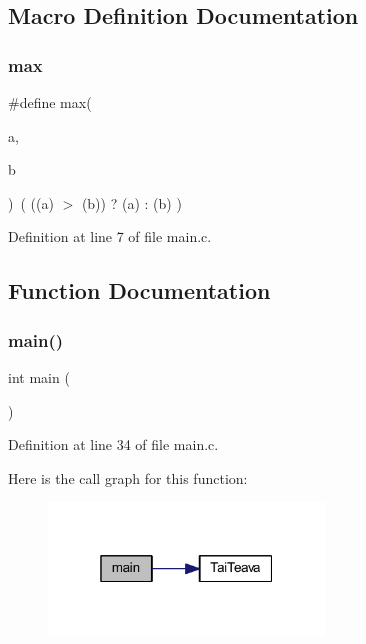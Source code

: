 \subsection{Macro Definition Documentation}
\mbox{\label{main_8c_affe776513b24d84b39af8ab0930fef7f}} 
\subsubsection{max}
{\footnotesize\ttfamily \#define max(\begin{DoxyParamCaption}\item[{}]{a,  }\item[{}]{b }\end{DoxyParamCaption})~( ((a) $>$ (b)) ? (a) \+: (b) )}



Definition at line 7 of file main.\+c.



\subsection{Function Documentation}
\mbox{\label{main_8c_ae66f6b31b5ad750f1fe042a706a4e3d4}} 
\subsubsection{main()}
{\footnotesize\ttfamily int main (\begin{DoxyParamCaption}{ }\end{DoxyParamCaption})}



Definition at line 34 of file main.\+c.

Here is the call graph for this function\+:
\nopagebreak
\begin{figure}[H]
\begin{center}
\leavevmode
\includegraphics[width=208pt]{main_8c_ae66f6b31b5ad750f1fe042a706a4e3d4_cgraph}
\end{center}
\end{figure}
\mbox{\label{main_8c_a716c4869232d48f9b77f6a715ffe0df0}} 
